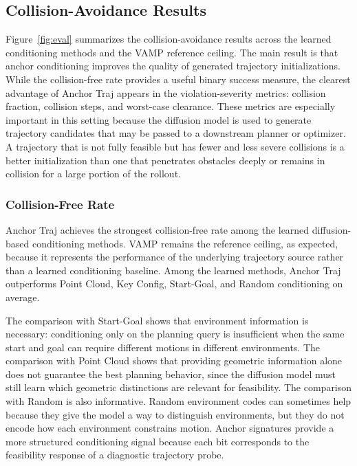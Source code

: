 
\subsection{Collision-Avoidance Results}

Figure~\ref{fig:eval} summarizes the collision-avoidance results across the learned conditioning methods and the VAMP reference ceiling. The main result is that anchor conditioning improves the quality of generated trajectory initializations. While the collision-free rate provides a useful binary success measure, the clearest advantage of Anchor Traj appears in the violation-severity metrics: collision fraction, collision steps, and worst-case clearance. These metrics are especially important in this setting because the diffusion model is used to generate trajectory candidates that may be passed to a downstream planner or optimizer. A trajectory that is not fully feasible but has fewer and less severe collisions is a better initialization than one that penetrates obstacles deeply or remains in collision for a large portion of the rollout.

\subsubsection{Collision-Free Rate}

Anchor Traj achieves the strongest collision-free rate among the learned diffusion-based conditioning methods. VAMP remains the reference ceiling, as expected, because it represents the performance of the underlying trajectory source rather than a learned conditioning baseline. Among the learned methods, Anchor Traj outperforms Point Cloud, Key Config, Start-Goal, and Random conditioning on average.

The comparison with Start-Goal shows that environment information is necessary: conditioning only on the planning query is insufficient when the same start and goal can require different motions in different environments. The comparison with Point Cloud shows that providing geometric information alone does not guarantee the best planning behavior, since the diffusion model must still learn which geometric distinctions are relevant for feasibility. The comparison with Random is also informative. Random environment codes can sometimes help because they give the model a way to distinguish environments, but they do not encode how each environment constrains motion. Anchor signatures provide a more structured conditioning signal because each bit corresponds to the feasibility response of a diagnostic trajectory probe.

